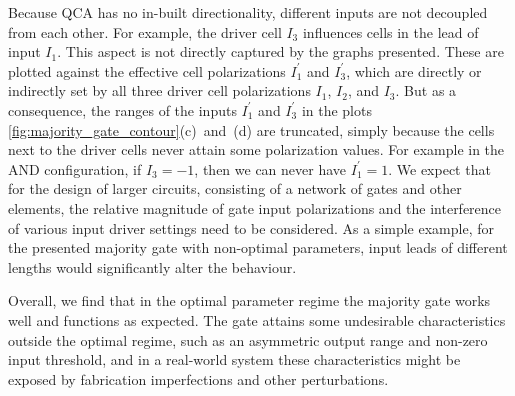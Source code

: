 Because QCA has no in-built directionality, different inputs are not decoupled
from each other. For example, the driver cell $I_3$ influences cells in the lead
of input $I_1$. This aspect is not directly captured by the graphs presented.
These are plotted against the effective cell polarizations $I_1^{\prime}$ and
$I_3^{\prime}$, which are directly or indirectly set by all three driver cell
polarizations $I_1$, $I_2$, and $I_3$. But as a consequence, the ranges of the
inputs $I_1^{\prime}$ and $I_3^{\prime}$ in the plots
\ref{fig:majority_gate_contour}(c)~and~(d) are truncated, simply because the
cells next to the driver cells never attain some polarization values. For
example in the AND configuration, if $I_3 = -1$, then we can never have
$I_1^{\prime} = 1$. We expect that for the design of larger circuits, consisting
of a network of gates and other elements, the relative magnitude of gate input
polarizations and the interference of various input driver settings need to be
considered. As a simple example, for the presented majority gate with
non-optimal parameters, input leads of different lengths would significantly
alter the behaviour.

Overall, we find that in the optimal parameter regime the majority gate works
well and functions as expected. The gate attains some undesirable
characteristics outside the optimal regime, such as an asymmetric output range
and non-zero input threshold, and in a real-world system these characteristics
might be exposed by fabrication imperfections and other perturbations.
